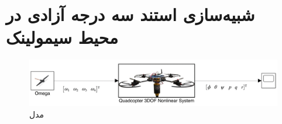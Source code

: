 \section{شبیه‌سازی استند سه درجه آزادی در محیط سیمولینک}
\begin{figure}[H]
	\includegraphics[width=16cm]{../../Figures/QuadSimulation/Stand_Model.png}
	\centering
	\caption{مدل}
\end{figure}